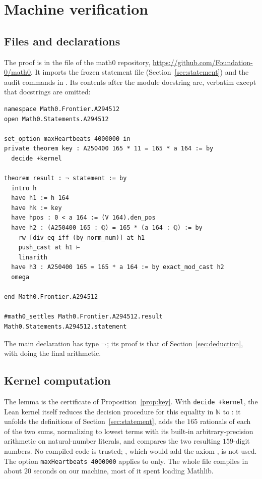 \documentclass[11pt]{amsart}
\theoremstyle{plain}
\theoremstyle{definition}
\newcommand{\N}{\mathbb{N}}
\begin{document}
\section{Machine verification}\label{sec:lean}

\subsection*{Files and declarations}
The proof is in the file  of the math0 repository, \url{https://github.com/Foundation-0/math0}. It imports the frozen statement file  (Section~\ref{sec:statement}) and the audit commands in . Its contents after the module docstring are, verbatim except that docstrings are omitted:
\begin{lstlisting}
namespace Math0.Frontier.A294512
open Math0.Statements.A294512

set_option maxHeartbeats 4000000 in
private theorem key : A250400 165 * 11 = 165 * a 164 := by
  decide +kernel

theorem result : ¬ statement := by
  intro h
  have h1 := h 164
  have hk := key
  have hpos : 0 < a 164 := (V 164).den_pos
  have h2 : (A250400 165 : ℚ) = 165 * (a 164 : ℚ) := by
    rw [div_eq_iff (by norm_num)] at h1
    push_cast at h1 ⊢
    linarith
  have h3 : A250400 165 = 165 * a 164 := by exact_mod_cast h2
  omega

end Math0.Frontier.A294512

#math0_settles Math0.Frontier.A294512.result Math0.Statements.A294512.statement
\end{lstlisting}
The main declaration  has type $\neg$\,; its proof is that of Section~\ref{sec:deduction}, with  doing the final arithmetic.

\subsection*{Kernel computation}
The lemma  is the certificate of Proposition~\ref{prop:key}. With \texttt{decide +kernel}, the Lean kernel itself reduces the decision procedure for this equality in $\N$ to : it unfolds the definitions of Section~\ref{sec:statement}, adds the $165$ rationals of each of the two sums, normalizing to lowest terms with its built-in arbitrary-precision arithmetic on natural-number literals, and compares the two resulting $159$-digit numbers. No compiled code is trusted; , which would add the axiom , is not used. The option \texttt{maxHeartbeats 4000000} applies to  only. The whole file compiles in about $20$ seconds on our machine, most of it spent loading Mathlib.
\end{document}
